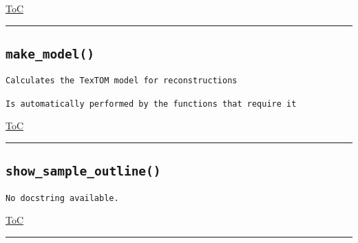 \documentclass{article}
\begin{document}
\begin{flushright}

\hyperref[toc]{ToC}

\end{flushright}



\vspace{5mm}

\hrule

\subsection*{\texttt{make\_model()}}
\label{fun:makemodel}

\begin{lstlisting}[language=docstring]
Calculates the TexTOM model for reconstructions

Is automatically performed by the functions that require it
\end{lstlisting}

\begin{flushright}

\hyperref[toc]{ToC}

\end{flushright}



\vspace{5mm}

\hrule

\subsection*{\texttt{show\_sample\_outline()}}
\label{fun:showsampleoutline}

\begin{lstlisting}[language=docstring]
No docstring available.
\end{lstlisting}

\begin{flushright}

\hyperref[toc]{ToC}

\end{flushright}



\vspace{5mm}

\hrule
\end{document}
